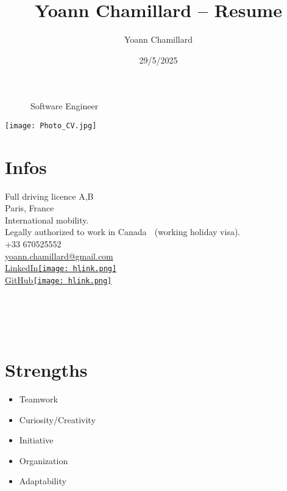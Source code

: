 \documentclass[]{friggeri-cv}
\title{Yoann Chamillard -- Resume}
\author{Yoann Chamillard}
\date{29/5/2025}
\begin{document}
      {~~~~~~Software Engineer}
      {}

\begin{aside}
\hspace{10mm}\texttt{[image: Photo\_CV.jpg]}
\section{Infos}

Full driving licence A,B\\
\vspace{2.5mm}
Paris, France\\
\vspace{1.5mm}
International mobility.\\
\vspace*{0.6mm}Legally authorized to work in Canada 🍁 (working holiday visa).\\
\vspace{2.5mm}
+33 670525552\\
\href{mailto:yoann.chamillard@gmail.com}{\small yoann.chamillard@gmail.com}\\
\vspace{2.5mm}
\href{https://www.linkedin.com/in/yoannchamillard/?locale=en_US}{LinkedIn\hspace{1.5mm}\texttt{[image: hlink.png]}}\\
\href{https://github.com/Nokheenig?tab=stars}{GitHub\hspace{1.5mm}\texttt{[image: hlink.png]}}\\
\vspace{2.5mm}
\\
\\
\\
\\
\vspace{2.5mm}%

\section{Strengths}
\begin{itemize}
\item Teamwork
\item Curiosity/Creativity
\item Initiative
\item Organization
\item Adaptability
\end{itemize}

\end{aside}
\end{document}
